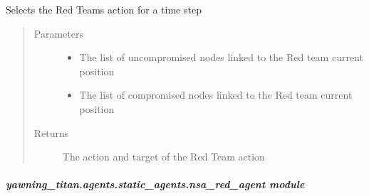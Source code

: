 \documentclass[letterpaper,10pt,english]{sphinxmanual}
\begin{document}
\begin{fulllineitems}
\begin{fulllineitems}
\label{\detokenize{source/yawning_titan.agents.static_agents:yawning_titan.agents.static_agents.fixed_red.FixedRedAgent.select_action}}
\sphinxAtStartPar
Selects the Red Teams action for a time step
\begin{quote}\begin{description}
\item[{Parameters}] \leavevmode\begin{itemize}
\item {}
\sphinxAtStartPar
{} \textendash{} The list of uncompromised nodes linked to the Red team current position

\item {}
\sphinxAtStartPar
{} \textendash{} The list of compromised nodes linked to the Red team current position

\end{itemize}

\item[{Returns}] \leavevmode
\sphinxAtStartPar
The action and target of the Red Team action

\end{description}\end{quote}

\end{fulllineitems}


\begin{fulllineitems}
\label{\detokenize{source/yawning_titan.agents.static_agents:yawning_titan.agents.static_agents.fixed_red.FixedRedAgent.update_location}}
\end{fulllineitems}


\end{fulllineitems}



\subparagraph{yawning\_titan.agents.static\_agents.nsa\_red\_agent module}
\label{\detokenize{source/yawning_titan.agents.static_agents:yawning-titan-agents-static-agents-nsa-red-agent-module}}
\end{document}
